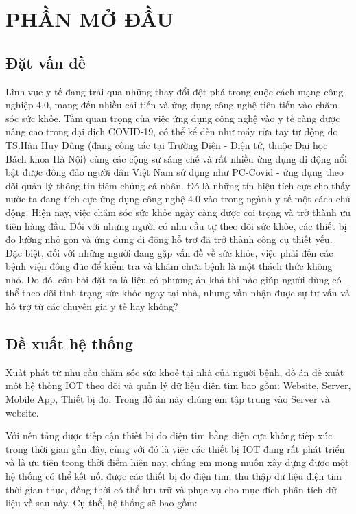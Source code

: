 
\section*{PHẦN MỞ ĐẦU}
\subsection*{Đặt vấn đề}


Lĩnh vực y tế đang trải qua những thay đổi đột phá trong cuộc cách mạng công nghiệp 4.0, mang đến nhiều cải tiến và ứng dụng công nghệ tiên tiến vào chăm sóc sức khỏe.
Tầm quan trọng của việc ứng dụng công nghệ vào y tế càng được nâng cao trong đại dịch COVID-19,
có thể kể đến như máy rửa tay tự động do TS.Hàn Huy Dũng (đang công tác tại Trường Điện - Điện tử, thuộc Đại học Bách khoa Hà Nội) 
cùng các cộng sự sáng chế \cite{ref_thay_dzung} và rất nhiều ứng dụng di động nổi bật được đông đảo người dân Việt Nam sử dụng như PC-Covid - ứng dụng theo dõi quản lý thông tin tiêm chủng cá nhân. Đó là những tín hiệu tích cực cho thấy nước ta đang tích cực ứng
dụng công nghệ 4.0 vào trong ngành y tế một cách chủ động. Hiện nay, việc chăm sóc sức khỏe ngày càng được coi trọng và trở thành ưu tiên hàng đầu. Đối
 với những người có nhu cầu tự theo dõi sức khỏe, các thiết bị đo lường nhỏ gọn và ứng dụng di động hỗ trợ đã trở thành công cụ thiết yếu. Đặc biệt,
  đối với những người đang gặp vấn đề về sức khỏe, việc phải đến các bệnh viện đông đúc để kiểm tra và khám chữa bệnh là một thách thức không nhỏ. Do đó,
   câu hỏi đặt ra là liệu có phương án khả thi nào giúp người dùng có thể theo dõi tình trạng sức khỏe ngay tại nhà, nhưng vẫn nhận được sự tư vấn và hỗ trợ từ các chuyên gia y tế hay không? 

\subsection*{Đề xuất hệ thống}

Xuất phát từ nhu cầu chăm sóc sức khoẻ tại nhà của người bệnh, đồ án đề xuất một hệ thống IOT theo dõi và quản lý dữ liệu điện tim bao gồm: Website, Server, Mobile App, Thiết bị đo. Trong đồ án này chúng em tập trung vào Server và website.

Với nền tảng được tiếp cận thiết bị đo điện tim bằng điện cực không tiếp xúc trong thời gian gần đây, 
cùng với đó là việc các thiết bị IOT đang rất phát triển và là ưu tiên trong thời điểm hiện nay, chúng em mong muốn xây dựng được một hệ thống
có thể kết nối được các thiết bị đo điện tim, thu thập dữ liệu điện tim thời gian thực, đồng thời có thể lưu trữ và phục vụ cho mục đích
phân tích dữ liệu về sau này. Cụ thể, hệ thống sẽ bao gồm:

